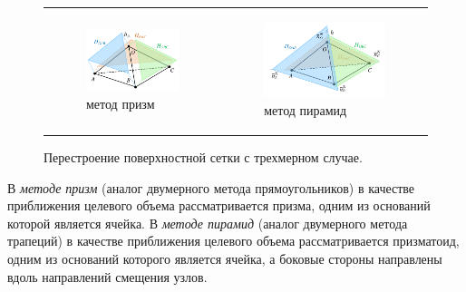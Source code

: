 \documentclass[a4paper,14pt]{extarticle}                     %
\theoremstyle{plain}                                         %
\begin{document}
\begin{figure}[h]
\centering
\begin{tabular}{ll}
\begin{subfigure}{0.4\textwidth}\centering\includegraphics[width=1.0\columnwidth]{fig/3dr_prisms_big.pdf}\caption{метод призм}\end{subfigure} &
\begin{subfigure}{0.45\textwidth}\centering\includegraphics[width=1.0\columnwidth]{fig/3dr_pyramids_big.pdf}\caption{метод пирамид}\end{subfigure}
\end{tabular}
\singlespacing
\caption{Перестроение поверхностной сетки с трехмерном случае.}
\label{fig:text_1_remesh3}
\end{figure}

В \textit{методе призм} (аналог двумерного метода прямоугольников) в качестве приближения целевого объема рассматривается призма, одним из оснований которой является ячейка.
В \textit{методе пирамид} (аналог двумерного метода трапеций) в качестве приближения целевого объема рассматривается призматоид, одним из оснований которого является ячейка, а боковые стороны направлены вдоль направлений смещения узлов.
\end{document}
